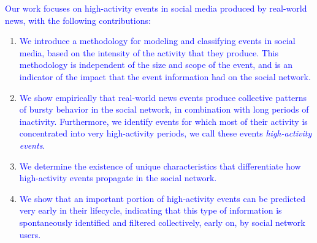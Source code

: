 \documentclass[10pt,letterpaper]{article}
\newcommand{\newtext}[1]{{\leavevmode\color{blue}#1}}
\begin{document}



\textcolor{blue}{Our work focuses on high-activity events in social media produced by
real-world news, with the following contributions:}
\begin{enumerate}

\item \textcolor{blue}{We introduce a methodology for modeling and classifying
events in social media, based on the intensity of the activity that they
produce. This methodology is independent of the size and scope of the event,
and is an indicator of the impact that the event information had on the social network.}

\item \textcolor{blue}{We show empirically that real-world news events produce collective
patterns of bursty behavior in the social network, in combination with long periods of
inactivity. Furthermore, we identify events for which most of their activity
is concentrated into very high-activity periods, we call these events {\em
high-activity events}.}

\item \textcolor{blue}{We determine the existence of unique characteristics that
differentiate how high-activity events propagate in the social network.}

\item \textcolor{blue}{We show that an important portion of high-activity events can be
predicted very early in their lifecycle, indicating that this type
of information is spontaneously identified and filtered collectively, early
on, by social network users.}

\end{enumerate}

\end{document}
